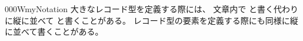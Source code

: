 \documentclass[index]{subfiles}
\begin{document}
\begin{myBlock}{000W}{myNotation}
  大きなレコード型を定義する際には、
  文章内で
  と書く代わりに縦に並べて
  と書くことがある。
  レコード型の要素を定義する際にも同様に縦に並べて書くことがある。
\end{myBlock}
\end{document}

